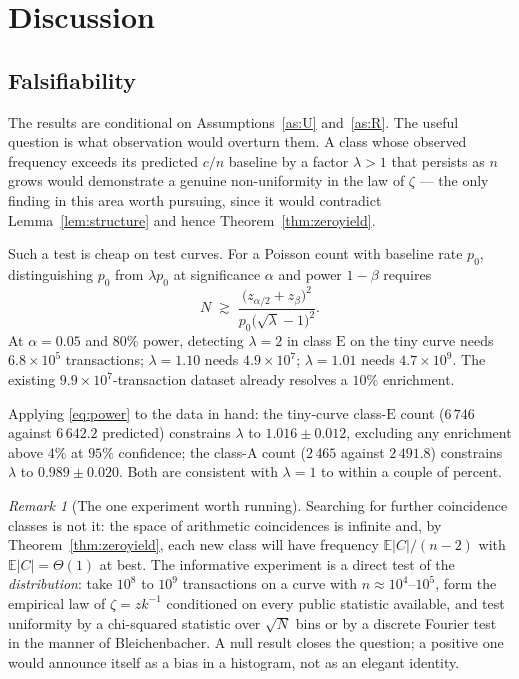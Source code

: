 \documentclass[11pt,a4paper]{article}
\theoremstyle{plain}
\theoremstyle{definition}
\theoremstyle{remark}
\newtheorem{remark}[theorem]{Remark}
\newcommand{\Ex}{\mathbb{E}}
\newcommand{\clA}{\mathrm{A}}
\newcommand{\clE}{\mathrm{E}}
\begin{document}
\section{Discussion}\label{sec:disc}

\subsection{Falsifiability}

The results are conditional on Assumptions~\ref{as:U} and~\ref{as:R}. The useful question is what
observation would overturn them. A class whose observed frequency exceeds its predicted $c/n$
baseline by a factor $\lambda > 1$ that persists as $n$ grows would demonstrate a genuine
non-uniformity in the law of $\zeta$ --- the only finding in this area worth pursuing, since it
would contradict Lemma~\ref{lem:structure} and hence Theorem~\ref{thm:zeroyield}.

Such a test is cheap on test curves. For a Poisson count with baseline rate $p_0$, distinguishing
$p_0$ from $\lambda p_0$ at significance $\alpha$ and power $1-\beta$ requires
\begin{equation}\label{eq:power}
  N \;\gtrsim\; \frac{\bigl(z_{\alpha/2} + z_{\beta}\bigr)^{2}}{p_0\bigl(\sqrt{\lambda}-1\bigr)^{2}} .
\end{equation}
At $\alpha = 0.05$ and $80\%$ power, detecting $\lambda = 2$ in class $\clE$ on the tiny curve
needs $6.8\times10^{5}$ transactions; $\lambda = 1.10$ needs $4.9\times10^{7}$; $\lambda = 1.01$
needs $4.7\times10^{9}$. The existing $9.9\times10^{7}$-transaction dataset already resolves a
$10\%$ enrichment.

Applying \eqref{eq:power} to the data in hand: the tiny-curve class-$\clE$ count ($6\,746$ against
$6\,642.2$ predicted) constrains $\lambda$ to $1.016 \pm 0.012$, excluding any enrichment above
$4\%$ at $95\%$ confidence; the class-$\clA$ count ($2\,465$ against $2\,491.8$) constrains
$\lambda$ to $0.989 \pm 0.020$. Both are consistent with $\lambda = 1$ to within a couple of
percent.

\begin{remark}[The one experiment worth running]
Searching for further coincidence classes is not it: the space of arithmetic coincidences is
infinite and, by Theorem~\ref{thm:zeroyield}, each new class will have frequency
$\Ex|C|/(n-2)$ with $\Ex|C| = \Theta(1)$ at best. The informative experiment is a direct test of
the \emph{distribution}: take $10^{8}$ to $10^{9}$ transactions on a curve with
$n \approx 10^{4}$--$10^{5}$, form the empirical law of $\zeta = zk^{-1}$ conditioned on every
public statistic available, and test uniformity by a chi-squared statistic over $\sqrt{N}$ bins or
by a discrete Fourier test in the manner of Bleichenbacher. A null result closes the question; a
positive one would announce itself as a bias in a histogram, not as an elegant identity.
\end{remark}
\end{document}
